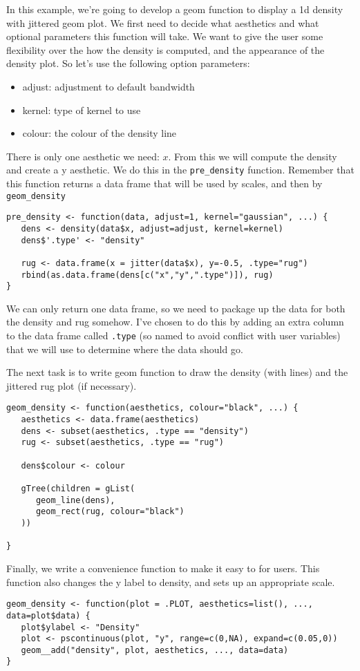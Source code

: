 In this example, we're going to develop a geom function to display a 1d density with jittered geom plot.  We first need to decide what aesthetics and what optional parameters this function will take.  We want to give the user some flexibility over the how the density is computed, and the appearance of the density plot.  So let's use the following option parameters:

\begin{itemize}
	\item adjust: adjustment to default bandwidth
	\item kernel: type of kernel to use
	\item colour: the colour of the density line
\end{itemize}

There is only one aesthetic we need: $x$.  From this we will compute the density and create a y aesthetic.  We do this in the \texttt{pre\_density} function.  Remember that this function returns a data frame that will be used by scales, and then by \texttt{geom\_density}

\begin{verbatim}
pre_density <- function(data, adjust=1, kernel="gaussian", ...) {
   dens <- density(data$x, adjust=adjust, kernel=kernel)
   dens$'.type' <- "density"

   rug <- data.frame(x = jitter(data$x), y=-0.5, .type="rug")
   rbind(as.data.frame(dens[c("x","y",".type")]), rug)
}
\end{verbatim}

We can only return one data frame, so we need to package up the data for both the density and rug somehow.  I've chosen to do this by adding an extra column to the data frame called \texttt{.type} (so named to avoid conflict with user variables) that we will use to determine where the data should go.

The next task is to write geom function to draw the density (with lines) and the jittered rug plot (if necessary).

\begin{verbatim}
geom_density <- function(aesthetics, colour="black", ...) {
   aesthetics <- data.frame(aesthetics)
   dens <- subset(aesthetics, .type == "density")
   rug <- subset(aesthetics, .type == "rug")

   dens$colour <- colour

   gTree(children = gList(
      geom_line(dens),
      geom_rect(rug, colour="black")
   ))

}
\end{verbatim}

Finally, we write a convenience function to make it easy to for users.  This function also changes the y label to density, and sets up an appropriate scale.

\begin{verbatim}
geom_density <- function(plot = .PLOT, aesthetics=list(), ..., data=plot$data) {
   plot$ylabel <- "Density"
   plot <- pscontinuous(plot, "y", range=c(0,NA), expand=c(0.05,0))
   geom__add("density", plot, aesthetics, ..., data=data)
}  
\end{verbatim}


